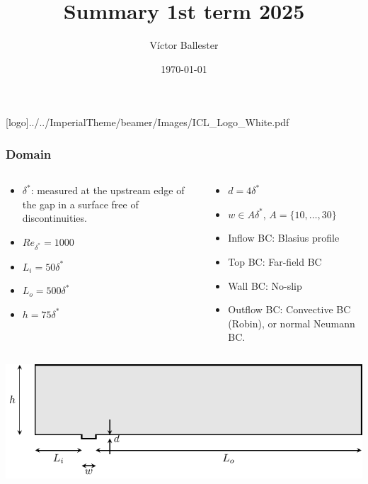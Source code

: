 \documentclass[
  aspectratio=169, %
  t, %
  onlytextwidth, %
  10pt, %
]{beamer}
\title{Summary 1st term 2025} %
\subtitle{} %
\author{Víctor Ballester} %
\date{\today} %
\def\imagefolder{../../ImperialTheme/beamer/Images}
\begin{document}
\begingroup
{} %
[logo]{\imagefolder/ICL_Logo_White.pdf} %
\frame[plain, s]{\titlepage} %
\endgroup

\begin{frame}
  \frametitle{Domain}
  \begin{columns}[T] %
    \begin{column}{0.48\linewidth} %
      \begin{itemize}
	\item $\delta^*$: measured at the upstream edge of the gap in a surface free of discontinuities.
	\item $Re_{\delta^*} = 1000$
	\item $L_i = 50\delta^*$
	\item $L_o = 500\delta^*$
	\item $h = 75\delta^*$
      \end{itemize}
    \end{column}
    \begin{column}{0.48\linewidth} %
      \begin{itemize}
	\item $d = 4\delta^*$
	\item $w \in A\delta^*$, $A = \{10,\ldots,30\}$
	\item Inflow BC: Blasius profile
	\item Top BC: Far-field BC
	\item Wall BC: No-slip
	\item Outflow BC: Convective BC (Robin), or normal Neumann BC.
      \end{itemize}
    \end{column}
  \end{columns}
  {
  \centering
  \includegraphics[width=1\textwidth]{../../Images/domain.pdf}
  }
\end{frame}
\end{document}
